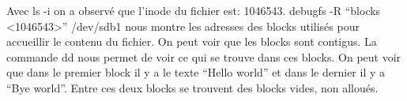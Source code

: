 \documentclass[12pt, letterpaper]{report}
\begin{document}
Avec ls -i on a observé que l’inode du fichier est: 1046543.
debugfs -R “blocks <1046543>” /dev/sdb1 nous montre les adresses des blocks utilisés pour accueillir le contenu du fichier. On peut voir que les blocks sont contigus.
La commande dd nous permet de voir ce qui se trouve dans ces blocks. On peut voir que dans le premier block il y a le texte “Hello world” et dans le dernier il y a “Bye world”. Entre ces deux blocks se trouvent des blocks vides, non alloués.
\end{document}
